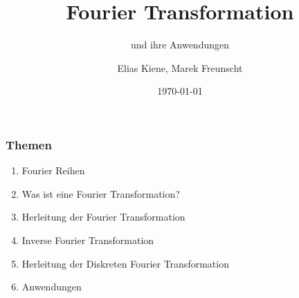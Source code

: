\documentclass{beamer}
\title{Fourier Transformation}
\subtitle{und ihre Anwendungen}
\author{Elias Kiene, Marek Freunscht}
\date{\today}
\begin{document}
\begin{frame}
    \titlepage
\end{frame}

\begin{frame}
    \frametitle{Themen}
    \begin{enumerate}
        \item Fourier Reihen
        \item Was ist eine Fourier Transformation?
        \item Herleitung der Fourier Transformation
        \item Inverse Fourier Transformation
        \item Herleitung der Diskreten Fourier Transformation
        \item Anwendungen
    \end{enumerate}
\end{frame}

    
    
    
\end{document}
